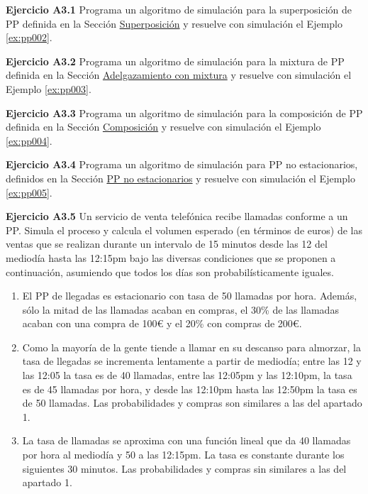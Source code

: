 \documentclass[
]{book}
\providecommand{\tightlist}{%
  \setlength{\itemsep}{0pt}\setlength{\parskip}{0pt}}
\theoremstyle{definition}
\theoremstyle{definition}
\theoremstyle{definition}
\theoremstyle{definition}
\theoremstyle{remark}
\begin{document}
\textbf{Ejercicio A3.1} Programa un algoritmo de simulación para la superposición de PP definida en la Sección \protect\hyperlink{superposicion_pp}{Superposición} y resuelve con simulación el Ejemplo \ref{ex:pp002}.

\textbf{Ejercicio A3.2} Programa un algoritmo de simulación para la mixtura de PP definida en la Sección \protect\hyperlink{adelgazamiento_pp}{Adelgazamiento con mixtura} y resuelve con simulación el Ejemplo \ref{ex:pp003}.

\textbf{Ejercicio A3.3} Programa un algoritmo de simulación para la composición de PP definida en la Sección \protect\hyperlink{composicion_pp}{Composición} y resuelve con simulación el Ejemplo \ref{ex:pp004}.

\textbf{Ejercicio A3.4} Programa un algoritmo de simulación para PP no estacionarios, definidos en la Sección \protect\hyperlink{pp_noestacionarios}{PP no estacionarios} y resuelve con simulación el Ejemplo \ref{ex:pp005}.

\textbf{Ejercicio A3.5} Un servicio de venta telefónica recibe llamadas conforme a un PP. Simula el proceso y calcula el volumen esperado (en términos de euros) de las ventas que se realizan durante un intervalo de 15 minutos desde las 12 del mediodía hasta las 12:15pm bajo las diversas condiciones que se proponen a continuación, asumiendo que todos los días son probabilísticamente iguales.

\begin{enumerate}
\def\labelenumi{\arabic{enumi}.}
\tightlist
\item
  El PP de llegadas es estacionario con tasa de 50 llamadas por hora. Además, sólo la mitad de las llamadas acaban en compras, el 30\% de las llamadas acaban con una compra de 100€ y el 20\% con compras de 200€.
\item
  Como la mayoría de la gente tiende a llamar en su descanso para almorzar, la tasa de llegadas se incrementa lentamente a partir de mediodía; entre las 12 y las 12:05 la tasa es de 40 llamadas, entre las 12:05pm y las 12:10pm, la tasa es de 45 llamadas por hora, y desde las 12:10pm hasta las 12:50pm la tasa es de 50 llamadas. Las probabilidades y compras son similares a las del apartado 1.
\item
  La tasa de llamadas se aproxima con una función lineal que da 40 llamadas por hora al mediodía y 50 a las 12:15pm. La tasa es constante durante los siguientes 30 minutos. Las probabilidades y compras sin similares a las del apartado 1.
\end{enumerate}
\end{document}
